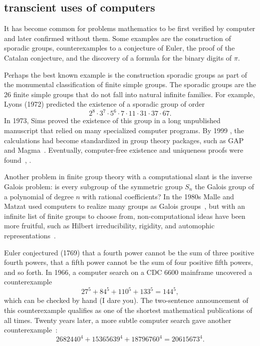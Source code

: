 \documentclass{llncs}
\begin{document}


\subsection{transcient uses of computers}

It has become common for problems mathematics to be first verified by
computer and later confirmed without them.  Some examples are
the construction of sporadic groups, counterexamples to a conjecture
of Euler, the proof of the Catalan conjecture, and the discovery of a formula
for the binary digits of $\pi$.

Perhaps the best known example is the construction sporadic groups as
part of the monumental classification of finite simple groups.  The
sporadic groups are the $26$ finite simple groups that do not fall into
natural infinite families.  For example,  Lyons (1972) predicted
the existence of a sporadic group of order
\[
2^ 8\cdot 3^7\cdot 5^6\cdot  7\cdot 11 \cdot 31 \cdot 37 \cdot 67.
\]
In 1973, Sims proved the existence of this group in a long unpublished
manuscript that relied on many specialized computer programs.  By 1999
, the calculations had become standardized in group theory packages,
such as GAP and Magma~\cite{HS99}.  Eventually, computer-free
existence and uniqueness proofs were found~\cite{MParker},
\cite{AS92}.


Another problem in finite group theory with a computational slant is
the inverse Galois problem: is every subgroup of the symmetric group
$S_n$ the Galois group of a polynomial of degree $n$ with rational
coefficients?  In the 1980s Malle and Matzat used computers to realize
many groups as Galois groups~\cite{MM}, but with an infinite list of
finite groups to choose from, non-computational ideas have been more
fruitful, such as Hilbert irreducibility, rigidity, and automophic
representations~\cite{KLS}.

\smallskip

Euler conjectured (1769) that a fourth power cannot be the sum of
three positive fourth powers, that a fifth power cannot be the sum of
four positive fifth powers, and so forth.  In 1966, a computer search
\cite{LP66} on a CDC 6600 mainframe uncovered a counterexample
\[
27^5 + 84^5 + 110^5 + 133^5 = 144^5,
\]
which can be checked by hand (I dare you).  The two-sentence
announcement of this counterexample qualifies as one of the shortest
mathematical publications of all times.  Twenty years later, a more
subtle computer search gave another counterexample~\cite{Elkies88}:
\[
2682440^4 + 15365639^4 + 18796760^4 = 20615673^4.
\]
\end{document}
